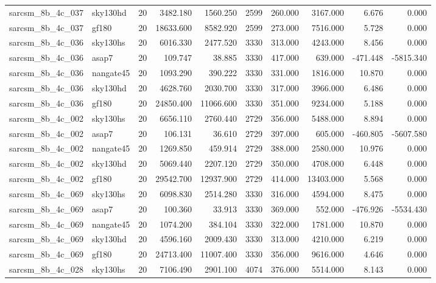 \begin{longtable}{llrrrrrrrr}
sarcsm\_8b\_4c\_037 & sky130hd & 20 & 3482.180 & 1560.250 & 2599 & 260.000 & 3167.000 & 6.676 & 0.000 \\
sarcsm\_8b\_4c\_037 & gf180 & 20 & 18633.600 & 8582.920 & 2599 & 273.000 & 7516.000 & 5.728 & 0.000 \\
sarcsm\_8b\_4c\_036 & sky130hs & 20 & 6016.330 & 2477.520 & 3330 & 313.000 & 4243.000 & 8.456 & 0.000 \\
sarcsm\_8b\_4c\_036 & asap7 & 20 & 109.747 & 38.885 & 3330 & 417.000 & 639.000 & -471.448 & -5815.340 \\
sarcsm\_8b\_4c\_036 & nangate45 & 20 & 1093.290 & 390.222 & 3330 & 331.000 & 1816.000 & 10.870 & 0.000 \\
sarcsm\_8b\_4c\_036 & sky130hd & 20 & 4628.760 & 2030.700 & 3330 & 317.000 & 3966.000 & 6.486 & 0.000 \\
sarcsm\_8b\_4c\_036 & gf180 & 20 & 24850.400 & 11066.600 & 3330 & 351.000 & 9234.000 & 5.188 & 0.000 \\
sarcsm\_8b\_4c\_002 & sky130hs & 20 & 6656.110 & 2760.440 & 2729 & 356.000 & 5488.000 & 8.894 & 0.000 \\
sarcsm\_8b\_4c\_002 & asap7 & 20 & 106.131 & 36.610 & 2729 & 397.000 & 605.000 & -460.805 & -5607.580 \\
sarcsm\_8b\_4c\_002 & nangate45 & 20 & 1269.850 & 459.914 & 2729 & 388.000 & 2580.000 & 10.976 & 0.000 \\
sarcsm\_8b\_4c\_002 & sky130hd & 20 & 5069.440 & 2207.120 & 2729 & 350.000 & 4708.000 & 6.448 & 0.000 \\
sarcsm\_8b\_4c\_002 & gf180 & 20 & 29542.700 & 12937.900 & 2729 & 414.000 & 13403.000 & 5.568 & 0.000 \\
sarcsm\_8b\_4c\_069 & sky130hs & 20 & 6098.830 & 2514.280 & 3330 & 316.000 & 4594.000 & 8.475 & 0.000 \\
sarcsm\_8b\_4c\_069 & asap7 & 20 & 100.360 & 33.913 & 3330 & 369.000 & 552.000 & -476.926 & -5534.430 \\
sarcsm\_8b\_4c\_069 & nangate45 & 20 & 1074.200 & 384.104 & 3330 & 322.000 & 1781.000 & 10.870 & 0.000 \\
sarcsm\_8b\_4c\_069 & sky130hd & 20 & 4596.160 & 2009.430 & 3330 & 313.000 & 4210.000 & 6.219 & 0.000 \\
sarcsm\_8b\_4c\_069 & gf180 & 20 & 24713.400 & 11007.400 & 3330 & 356.000 & 9616.000 & 4.646 & 0.000 \\
sarcsm\_8b\_4c\_028 & sky130hs & 20 & 7106.490 & 2901.100 & 4074 & 376.000 & 5514.000 & 8.143 & 0.000 \\

\end{longtable}
